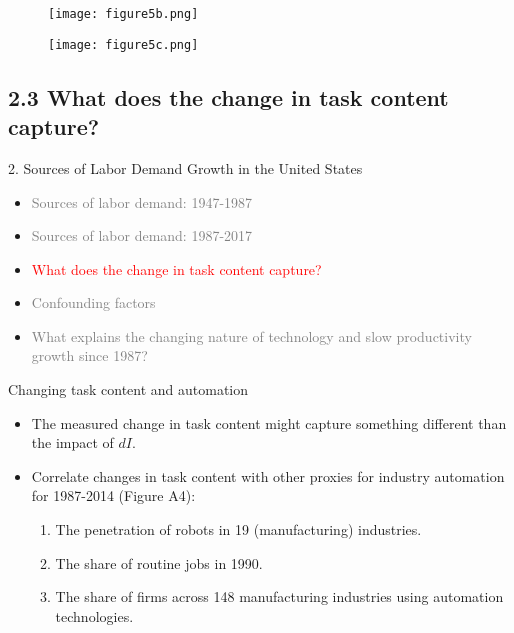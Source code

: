 \documentclass[notes=show]{beamer}
\begin{document}
\newpage
\begin{center}
\begin{figure}
\texttt{[image: figure5b.png]}
\end{figure} 
\end{center}
\newpage

\newpage
\begin{center}
\begin{figure}
\texttt{[image: figure5c.png]}
\end{figure} 
\end{center}
\newpage

\subsection{2.3 What does the change in task content capture?}

\begin{frame}{2. Sources of Labor Demand Growth in the United States}
\begin{itemize}
\item[\textcolor{gray}{2.1}] \textcolor{gray}{Sources of labor demand: 1947-1987} \medskip
\item[\textcolor{gray}{2.2}] \textcolor{gray}{Sources of labor demand: 1987-2017} \medskip
\item[\textcolor{red}{2.3}] \textcolor{red}{What does the change in task content capture?} \medskip
\item[\textcolor{gray}{2.4}] \textcolor{gray}{Confounding factors} \medskip
\item[\textcolor{gray}{2.5}] \textcolor{gray}{What explains the changing nature of technology and slow productivity growth since 1987?} 
\end{itemize}
\end{frame}

\begin{frame}{Changing task content and automation}
\begin{itemize}
\item The measured change in task content might capture something different than the impact of $dI$. \medskip
\item Correlate changes in task content with other proxies for industry automation for 1987-2014 (Figure A4): \medskip
\begin{enumerate}
\item The penetration of robots in 19 (manufacturing) industries. \medskip
\item The share of routine jobs in 1990. \medskip
\item The share of firms across 148 manufacturing industries using automation technologies.
\end{enumerate}
\end{itemize}
\end{frame}
\end{document}
